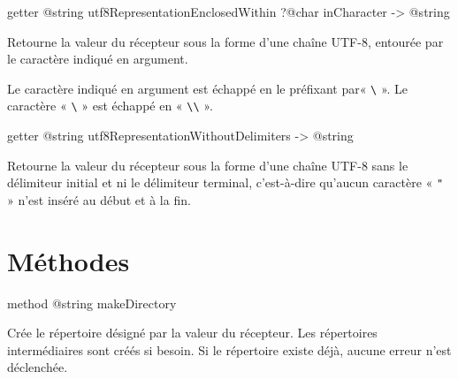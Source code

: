 
\begin{galgas4box}
getter @string utf8RepresentationEnclosedWithin ?@char inCharacter -> @string
\end{galgas4box}

Retourne la valeur du récepteur sous la forme d'une chaîne UTF-8, entourée par le caractère indiqué en argument.

Le caractère indiqué en argument est échappé en le préfixant par« \texttt{\textbackslash} ». Le caractère « \texttt{\textbackslash} » est échappé en « \texttt{\textbackslash\textbackslash} ».










\begin{galgas4box}
getter @string utf8RepresentationWithoutDelimiters -> @string
\end{galgas4box}

Retourne la valeur du récepteur sous la forme d'une chaîne UTF-8 sans le délimiteur initial et ni le délimiteur terminal, c'est-à-dire qu'aucun caractère « \texttt{"} » n'est inséré au début et à la fin.














\section{Méthodes}






\begin{galgas4box}
method @string makeDirectory
\end{galgas4box}

Crée le répertoire désigné par la valeur du récepteur. Les répertoires intermédiaires sont créés si besoin. Si le répertoire existe déjà, aucune erreur n'est déclenchée.







